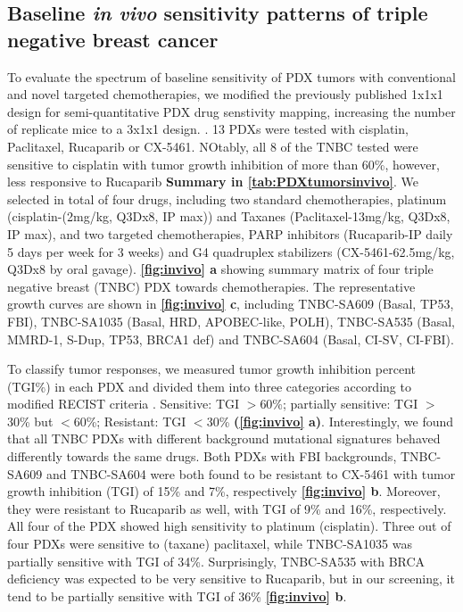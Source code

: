 \subsection{Baseline \textit{in vivo} sensitivity patterns of triple negative breast cancer}
To evaluate the spectrum of baseline sensitivity of PDX tumors with conventional and novel targeted chemotherapies, we modified the previously published 1x1x1 design for semi-quantitative PDX drug senstivity mapping, increasing the number of replicate mice to a 3x1x1 design. \cite{gao2015high,migliardi2012inhibition}. 
 13 PDXs were tested with cisplatin, Paclitaxel, Rucaparib or CX-5461. NOtably, all 8 of the TNBC tested were sensitive to cisplatin with tumor growth inhibition of more than 60\%, however, less responsive to Rucaparib \textbf{Summary in \autoref{tab:PDXtumorsinvivo}}. 
We selected in total of four drugs, including two standard chemotherapies, platinum (cisplatin-(2mg/kg, \ac{Q3Dx8}, \ac{IP} max)) and Taxanes (Paclitaxel-13mg/kg, \ac{Q3Dx8}, \ac{IP} max), and two targeted chemotherapies, PARP inhibitors (Rucaparib-\ac{IP} daily 5 days per week for 3 weeks) and G4 quadruplex stabilizers (CX-5461-62.5mg/kg, \ac{Q3Dx8} by oral gavage). 
\textbf{\autoref{fig:invivo} a} showing summary matrix of four triple negative breast (TNBC) PDX towards chemotherapies. 
The representative growth curves are shown in \textbf{\autoref{fig:invivo} c}, including TNBC-SA609 (Basal, TP53, FBI), TNBC-SA1035 (Basal, HRD, APOBEC-like, POLH), TNBC-SA535 (Basal, MMRD-1, S-Dup, TP53, BRCA1 def) and TNBC-SA604 (Basal, CI-SV, CI-FBI).

To classify tumor responses, we measured tumor growth inhibition percent (TGI\%) in each PDX and divided them into three categories according to modified RECIST criteria \cite{aykan2020objective}. Sensitive: \ac{TGI} $>$60\%; partially sensitive: \ac{TGI} $>$30\% but $<$60\%; Resistant: \ac{TGI} $<$30\% \textbf{(\autoref{fig:invivo} a)}.
Interestingly, we found that all TNBC PDXs with different background mutational signatures behaved differently towards the same drugs. Both PDXs with FBI backgrounds, TNBC-SA609 and TNBC-SA604 were both found to be resistant to CX-5461 with tumor growth inhibition (TGI) of 15\% and 7\%, respectively \textbf{\autoref{fig:invivo} b}. Moreover, they were resistant to Rucaparib as well, with \ac{TGI} of 9\% and 16\%, respectively.
All four of the PDX showed high sensitivity to platinum (cisplatin). Three out of four PDXs were sensitive to (taxane) paclitaxel, while TNBC-SA1035 was partially sensitive with \ac{TGI} of 34\%. Surprisingly,  TNBC-SA535 with BRCA deficiency was expected to be very sensitive to Rucaparib, but in our screening, it tend to be partially sensitive with \ac{TGI} of 36\% \textbf{\autoref{fig:invivo} b}.


